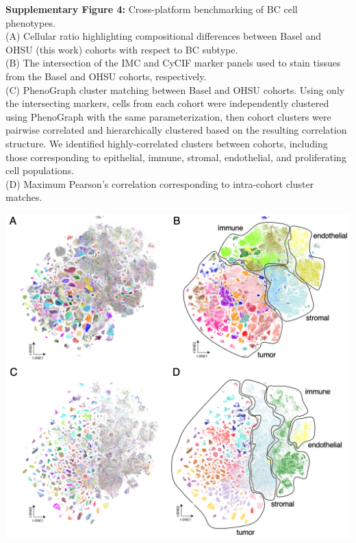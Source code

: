 \documentclass[preprint,review,3p,12pt]{elsarticle}
\begin{document}
\newpage

\noindent
\textbf{Supplementary Figure 4:} Cross-platform benchmarking of BC cell phenotypes.\\
(A) Cellular ratio highlighting compositional differences between Basel \cite{jackson_single-cell_2020} and OHSU (this work) cohorts with respect to BC subtype.\\
(B) The intersection of the IMC and CyCIF marker panels used to stain tissues from the Basel and OHSU cohorts, respectively.\\
(C) PhenoGraph cluster matching between Basel and OHSU cohorts. Using only the intersecting markers, cells from each cohort were independently clustered using PhenoGraph with the same parameterization, then cohort clusters were pairwise correlated and hierarchically clustered based on the resulting correlation structure. We identified highly-correlated clusters between cohorts, including those corresponding to epithelial, immune, stromal, endothelial, and proliferating cell populations.\\
(D) Maximum Pearson's correlation corresponding to intra-cohort cluster matches.

\begin{suppfigure}[p]
\centering\includegraphics[width=\linewidth,
                 keepaspectratio]{suppfig5}
\caption{}
\label{fig:suppfig5}
\end{suppfigure}
\end{document}
